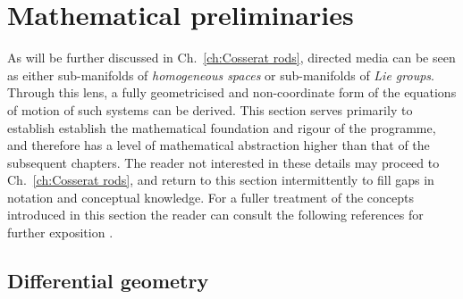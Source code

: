 



\section{Mathematical preliminaries} \label{sec:Mathematical preliminaries}

As will be further discussed in Ch.~\ref{ch:Cosserat rods}, directed media can be seen as either sub-manifolds of \textit{homogeneous spaces} or sub-manifolds of \textit{Lie groups}. Through this lens, a fully geometricised and non-coordinate form of the equations of motion of such systems can be derived. This section serves primarily to establish establish the mathematical foundation and rigour of the programme, and therefore has a level of mathematical abstraction higher than that of the subsequent chapters. The reader not interested in these details may proceed to Ch.~\ref{ch:Cosserat rods}, and return to this section intermittently to fill gaps in notation and conceptual knowledge. For a fuller treatment of the concepts introduced in this section the reader can consult the following references for further exposition \citep{clellandFrenetCartanMethod2017, kleinDevelopmentMathematics19th1979, marsdenIntroductionMechanicsSymmetry2013, marleHenriPoincareNote2013a}.

\subsection{Differential geometry}

